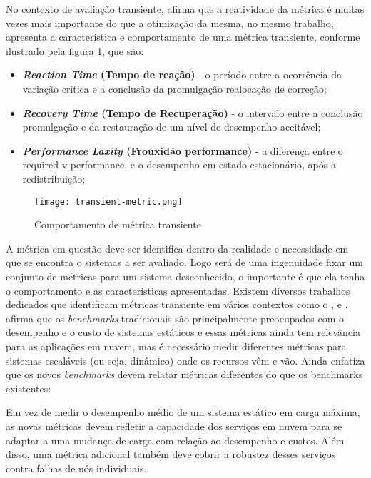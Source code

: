 No contexto de avaliação transiente,  afirma que a reatividade da métrica é muitas vezes mais importante do que a otimização da mesma, no mesmo trabalho,  apresenta a característica e comportamento de uma métrica transiente, conforme ilustrado pela figura \ref{fig:transient-metric}, que são: 
\begin{itemize}
	\item \textbf{\textit{Reaction Time} (Tempo de reação)} - o período entre a ocorrência da variação crítica e a conclusão da promulgação realocação de correção;
	
	\item \textbf{\textit{Recovery Time} (Tempo de Recuperação)}  - o intervalo entre a conclusão promulgação e da restauração de um nível de desempenho aceitável;
	
	\item \textbf{\textit{Performance Laxity} (Frouxidão performance)} - a diferença entre o required v performance, e o desempenho em estado estacionário, após a redistribuição;
\end{itemize}


\begin{figure}[!htb]
	\centering
	\texttt{[image: transient-metric.png]}
	\caption{Comportamento de métrica transiente}
	\label{fig:transient-metric}
\end{figure}


A métrica em questão deve ser identifica dentro da realidade e necessidade em que se encontra o sistemas a ser avaliado. Logo será de uma ingenuidade fixar um conjunto de métricas para um sistema desconhecido, o importante é que ela tenha o comportamento e as características apresentadas. Existem diversos trabalhos dedicados que identificam métricas transiente em vários contextos como o ,  e .
 afirma que os \textit{benchmarks} tradicionais são principalmente preocupados com o desempenho e o custo de sistemas estáticos e essas métricas ainda tem relevância para as aplicações em nuvem, mas é necessário medir diferentes métricas para sistemas escaláveis (ou seja, dinâmico) onde os recursos vêm e vão. Ainda  enfatiza que os novos \textit{benchmarks} devem relatar métricas diferentes do que os benchmarks existentes: 
\begin{citacao}
	Em vez de medir o desempenho médio de um sistema estático em carga máxima, as novas métricas devem refletir a capacidade dos serviços em nuvem para se adaptar a uma mudança de carga com relação ao desempenho e custos. Além disso, uma métrica adicional também deve cobrir a robustez desses serviços contra falhas de nós individuais.
\end{citacao}

